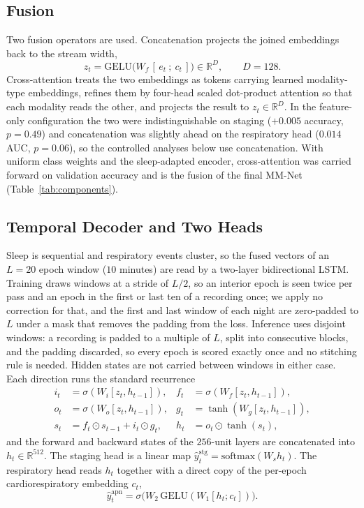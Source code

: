 \documentclass{ieeeaccess}
\begin{document}
\subsection{Fusion}
Two fusion operators are used. Concatenation projects the joined embeddings back to the
stream width,
\begin{equation}
z_t=\mathrm{GELU}\!\big(W_f\,[\,e_t\ ;\ c_t\,]\big)\in\mathbb{R}^{D},\qquad D=128.
\end{equation}
Cross-attention treats the two embeddings as tokens carrying learned modality-type
embeddings, refines them by four-head scaled dot-product attention so that each modality
reads the other, and projects the result to $z_t\in\mathbb{R}^{D}$. In the feature-only
configuration the two were indistinguishable on staging ($+0.005$ accuracy, $p=0.49$) and
concatenation was slightly ahead on the respiratory head ($0.014$ AUC, $p=0.06$), so the
controlled analyses below use concatenation. With uniform class weights and the
sleep-adapted encoder, cross-attention was carried forward on validation accuracy and is the
fusion of the final MM-Net (Table~\ref{tab:components}).

\subsection{Temporal Decoder and Two Heads}
Sleep is sequential and respiratory events cluster, so the fused vectors of an $L=20$ epoch
window ($10$ minutes) are read by a two-layer bidirectional LSTM. Training draws windows at a
stride of $L/2$, so an interior epoch is seen twice per pass and an epoch in the first or last
ten of a recording once; we apply no correction for that, and the first and last window of
each night are zero-padded to $L$ under a mask that removes the padding from the loss.
Inference uses disjoint windows: a recording is padded to a multiple of $L$, split into
consecutive blocks, and the padding discarded, so every epoch is scored exactly once and no
stitching rule is needed. Hidden states are not carried between windows in either case.
Each direction runs the
standard recurrence
\begin{align}
i_t&=\sigma(W_i[z_t,h_{t-1}]), & f_t&=\sigma(W_f[z_t,h_{t-1}]),\nonumber\\
o_t&=\sigma(W_o[z_t,h_{t-1}]), & g_t&=\tanh(W_g[z_t,h_{t-1}]),\\
s_t&=f_t\odot s_{t-1}+i_t\odot g_t, & h_t&=o_t\odot\tanh(s_t),\nonumber
\end{align}
and the forward and backward states of the $256$-unit layers are concatenated into
$h_t\in\mathbb{R}^{512}$. The
staging head is a linear map $\hat y^{\mathrm{stg}}_t=\mathrm{softmax}(W_s h_t)$. The
respiratory head reads $h_t$ together with a direct copy of the per-epoch cardiorespiratory
embedding $c_t$,
\begin{equation}
\hat y^{\mathrm{apn}}_t=\sigma\!\big(W_2\,\mathrm{GELU}(W_1[h_t;c_t])\big).
\end{equation}
\end{document}
